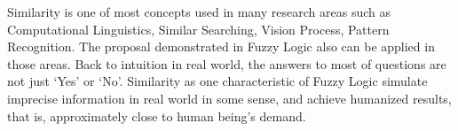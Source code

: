 \documentclass[Thesis.tex]{subfiles}
\begin{document}
Similarity
is one of most concepts used in many research areas such as Computational Linguistics, Similar Searching, Vision Process, Pattern Recognition. The proposal demonstrated in Fuzzy Logic also can be applied in those areas. Back to intuition in real world, the answers to most of questions are not just `Yes' or `No'. Similarity
 as 
 one characteristic of Fuzzy Logic simulate imprecise information in real world in some sense, and achieve humanized results, that is, approximately close to human being's demand. 
\end{document}
